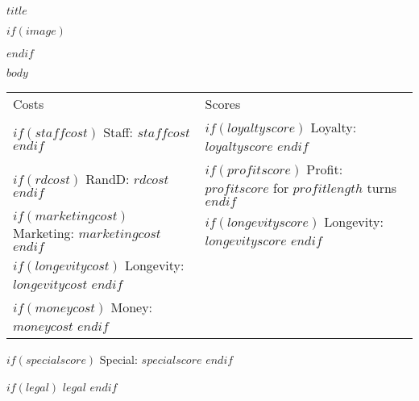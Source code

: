 \documentclass{article}
\begin{document}

  \begin{flushright}
    {$title$}
  \end{flushright}
  $if(image)$
  \begin{figure}[H]
      \centering
      \def\svgwidth{\columnwidth}
      \scalebox{0.5}{}
  \end{figure}
  $endif$
  \begin{flushleft}
    \scriptsize{$body$}
  \end{flushleft}
  \scriptsize
  \begin{tabular}{ l l }
    Costs & Scores \\
    $if(staffcost)$ Staff: {$staffcost$} $endif$ & $if(loyaltyscore)$ Loyalty: {$loyaltyscore$} $endif$ \\
    $if(rdcost)$ RandD: {$rdcost$} $endif$ & $if(profitscore)$ Profit: {$profitscore$} for {$profitlength$} turns $endif$ \\
    $if(marketingcost)$ Marketing: {$marketingcost$} $endif$ & $if(longevityscore)$ Longevity: {$longevityscore$} $endif$ \\
    $if(longevitycost)$ Longevity: {$longevitycost$} $endif$ &  \\
    $if(moneycost)$ Money: {$moneycost$} $endif$ &
  \end{tabular}
  \begin{flushleft}
    $if(specialscore)$
    Special: {$specialscore$}
    $endif$
  \end{flushleft}
  \begin{center}
    $if(legal)$
    \tiny{$legal$}
    $endif$
  \end{center}
\end{document}

